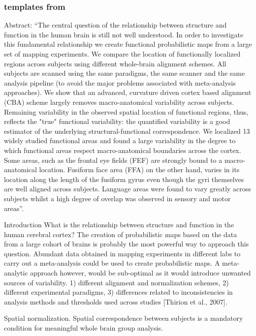 \subsubsection{templates from \citet{frost2012measuring}}

Abstract: ``The central question of the relationship between structure and
function in the human brain is still not well understood.
%
In order to investigate this fundamental relationship we create functional
probabilistic maps from a large set of mapping experiments.
%
We compare the location of functionally localized regions across subjects using
different whole-brain alignment schemes.
%
All subjects are scanned using the same paradigms, the same scanner and the same
analysis pipeline (to avoid the major problems associated with meta-analysis
approaches).
%
We show that an advanced, curvature driven cortex based alignment (CBA) scheme
largely removes macro-anatomical variability across subjects.
%
Remaining variability in the observed spatial location of functional regions,
thus, reflects the "true" functional variability:
%
the quantified variability is a good estimator of the underlying
structural-functional correspondence.
%
We localized 13 widely studied functional areas and found a large variability in
the degree to which functional areas respect macro-anatomical boundaries across
the cortex.
%
Some areas, such as the frontal eye fields (FEF) are strongly bound to a
macro-anatomical location.
%
Fusiform face area (FFA) on the other hand, varies in its location along the
length of the fusiform gyrus even though the gyri themselves are well aligned
across subjects.
%
Language areas were found to vary greatly across subjects whilst a high degree
of overlap was observed in sensory and motor areas''.

Introduction
%
What is the relationship between structure and function in the human cerebral
cortex?
%
The creation of probabilistic maps based on the data from a large cohort of
brains is probably the most powerful way to approach this question.
%
Abundant data obtained in mapping experiments in different labs to carry out a
meta-analysis could be used to create probabilistic maps.
%
A meta-analytic approach however, would be sub-optimal as it would introduce
unwanted sources of variability.
%
1) different alignment and normalization schemes,
%
2) different experimental paradigms,
%
3) differences related to inconsistencies in analysis methods and thresholds
used across studies [Thirion et al., 2007].


Spatial normalization.
%
Spatial correspondence between subjects is a mandatory condition for meaningful
whole brain group analysis.


